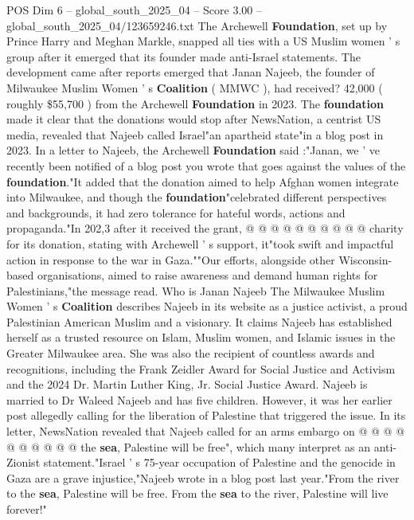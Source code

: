 \begin{textsample}{POS Dim 6 – global\_south\_2025\_04 – Score 3.00 – global\_south\_2025\_04/123659246.txt}  \label{ex:f6_pos_290}
The Archewell \textbf{Foundation}, set up by Prince Harry and Meghan Markle, snapped all ties with a US Muslim women ' s group after it emerged that its founder made anti-Israel statements.
The development came after reports emerged that Janan Najeeb, the founder of Milwaukee Muslim Women ' s \textbf{Coalition} ( MMWC ), had received? 42,000 ( roughly \$55,700 ) from the Archewell \textbf{Foundation} in 2023.
The \textbf{foundation} made it clear that the donations would stop after NewsNation, a centrist US media, revealed that Najeeb called Israel"an apartheid state"in a blog post in 2023.
In a letter to Najeeb, the Archewell \textbf{Foundation} said :"Janan, we ' ve recently been notified of a blog post you wrote that goes against the values of the \textbf{foundation}."It added that the donation aimed to help Afghan women integrate into Milwaukee, and though the \textbf{foundation}"celebrated different perspectives and backgrounds, it had zero tolerance for hateful words, actions and propaganda."In 202,3 after it received the grant, @ @ @ @ @ @ @ @ @ @ charity for its donation, stating with Archewell ' s support, it"took swift and impactful action in response to the war in Gaza.""Our efforts, alongside other Wisconsin-based organisations, aimed to raise awareness and demand human rights for Palestinians,"the message read.
Who is Janan Najeeb The Milwaukee Muslim Women ' s \textbf{Coalition} describes Najeeb in its website as a justice activist, a proud Palestinian American Muslim and a visionary.
It claims Najeeb has established herself as a trusted resource on Islam, Muslim women, and Islamic issues in the Greater Milwaukee area.
She was also the recipient of countless awards and recognitions, including the Frank Zeidler Award for Social Justice and Activism and the 2024 Dr.
Martin Luther King, Jr.
Social Justice Award.
Najeeb is married to Dr Waleed Najeeb and has five children.
However, it was her earlier post allegedly calling for the liberation of Palestine that triggered the issue.
In its letter, NewsNation revealed that Najeeb called for an arms embargo on @ @ @ @ @ @ @ @ @ @ the \textbf{sea}, Palestine will be free", which many interpret as an anti-Zionist statement."Israel ' s 75-year occupation of Palestine and the genocide in Gaza are a grave injustice,"Najeeb wrote in a blog post last year."From the river to the \textbf{sea}, Palestine will be free.
From the \textbf{sea} to the river, Palestine will live forever!"

\end{textsample}
